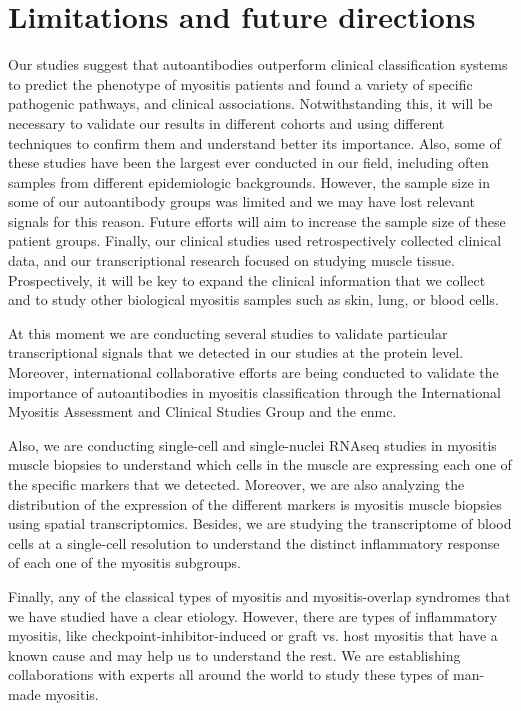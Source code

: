\section{Limitations and future directions}
Our studies suggest that autoantibodies outperform clinical classification systems to predict the phenotype of myositis patients and found a variety of specific pathogenic pathways, and clinical associations. Notwithstanding this, it will be necessary to validate our results in different cohorts and using different techniques to confirm them and understand better its importance. Also, some of these studies have been the largest ever conducted in our field, including often samples from different epidemiologic backgrounds. However, the sample size in some of our autoantibody groups was limited and we may have lost relevant signals for this reason. Future efforts will aim to increase the sample size of these patient groups. Finally, our clinical studies used retrospectively collected clinical data, and our transcriptional research focused on studying muscle tissue. Prospectively, it will be key to expand the clinical information that we collect and to study other biological myositis samples such as skin, lung, or blood cells.

At this moment we are conducting several studies to validate particular transcriptional signals that we detected in our studies at the protein level. Moreover, international collaborative efforts are being conducted to validate the importance of autoantibodies in myositis classification through the International Myositis Assessment and Clinical Studies Group and the \gls{enmc}.

Also, we are conducting single-cell and single-nuclei RNAseq studies in myositis muscle biopsies to understand which cells in the muscle are expressing each one of the specific markers that we detected. Moreover, we are also analyzing the distribution of the expression of the different markers is myositis muscle biopsies using spatial transcriptomics. Besides, we are studying the transcriptome of blood cells at a single-cell resolution to understand the distinct inflammatory response of each one of the myositis subgroups.

Finally, any of the classical types of myositis and myositis-overlap syndromes that we have studied have a clear etiology. However, there are types of inflammatory myositis, like checkpoint-inhibitor-induced or graft vs. host myositis that have a known cause and may help us to understand the rest. We are establishing collaborations with experts all around the world to study these types of man-made myositis.

 